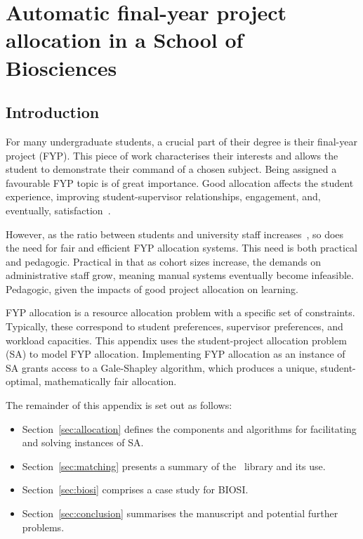 \chapter{Automatic final-year project allocation in a School of Biosciences}
\label{app:biosci}

\section{Introduction}

For many undergraduate students, a crucial part of their degree is their
final-year project (FYP). This piece of work characterises their interests and
allows the student to demonstrate their command of a chosen subject. Being
assigned a favourable FYP topic is of great importance. Good allocation affects
the student experience, improving student-supervisor relationships, engagement,
and, eventually, satisfaction~\cite{Briffa2018,Kuh2009}.

However, as the ratio between students and university staff
increases~\cite{McDonald2013}, so does the need for fair and efficient FYP
allocation systems. This need is both practical and pedagogic. Practical in that
as cohort sizes increase, the demands on administrative staff grow, meaning
manual systems eventually become infeasible. Pedagogic, given the impacts of
good project allocation on learning.

FYP allocation is a resource allocation problem with a specific set of
constraints. Typically, these correspond to student preferences, supervisor
preferences, and workload capacities. This appendix uses the student-project
allocation problem (SA) to model FYP allocation. Implementing FYP allocation as
an instance of SA grants access to a Gale-Shapley algorithm, which produces a
unique, student-optimal, mathematically fair allocation.

The remainder of this appendix is set out as follows:

\begin{itemize}
    \item Section~\ref{sec:allocation} defines the components and algorithms for
        facilitating and solving instances of SA.
    \item Section~\ref{sec:matching} presents a summary of the \matching\
        library and its use.
    \item Section~\ref{sec:biosi} comprises a case study for BIOSI.
    \item Section~\ref{sec:conclusion} summarises the manuscript and potential
        further problems.
\end{itemize}


